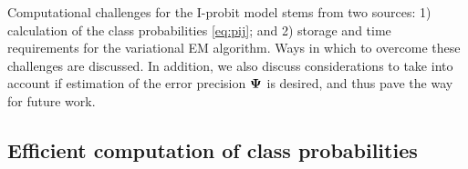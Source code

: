 Computational challenges for the I-probit model stems from two sources: 1) calculation of the class probabilities \cref{eq:pij}; and 2) storage and time requirements for the variational EM algorithm.
Ways in which to overcome these challenges are discussed.
In addition, we also discuss considerations to take into account if estimation of the error precision ${\bm\Psi}$ is desired, and thus pave the way for future work.

\subsection{Efficient computation of class probabilities}
\label{sec:mnint}


%

